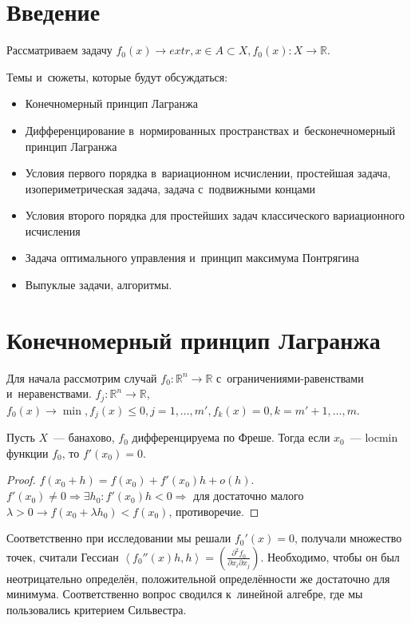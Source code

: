 \documentclass{article}
\begin{document}
\section{Введение}

Рассматриваем задачу $f_0(x) \rightarrow extr, x \in A \subset X, f_0(x): X
\rightarrow \mathbb{R}$.

Темы и~сюжеты, которые будут обсуждаться:
\begin{itemize}
	\item Конечномерный принцип Лагранжа
	\item Дифференцирование в~нормированных пространствах и~бесконечномерный
		принцип Лагранжа
	\item Условия первого порядка в~вариационном исчислении, простейшая задача,
		изопериметрическая задача, задача с~подвижными концами
	\item Условия второго порядка для простейших задач классического вариационного
		исчисления
	\item Задача оптимального управления и~принцип максимума Понтрягина
	\item Выпуклые задачи, алгоритмы.
\end{itemize}

\section{Конечномерный принцип Лагранжа}

Для начала рассмотрим случай $f_0: \mathbb{R}^n \rightarrow \mathbb{R}$
с~ограничениями-равенствами и~неравенствами. $f_j: \mathbb{R}^n \rightarrow
\mathbb{R}$, $f_0(x) \rightarrow \min, f_j(x) \le 0, j = 1, \ldots, m', f_k(x) =
0, k = m' + 1, \ldots, m$.

\begin{theorem}[Ферма, 1638]
	Пусть $X$~--- банахово, $f_0$ дифференцируема по Фреше. Тогда если $x_0$~---
	locmin функции $f_0$, то $f'(x_0) = 0$.
\end{theorem}
\begin{proof}
	$f(x_0 + h) = f(x_0) + f'(x_0)h + o(h)$. $f'(x_0) \ne 0 \Rightarrow \exists
	h_0: f'(x_0)h < 0 \Rightarrow $ для достаточно малого $\lambda > 0 \rightarrow
	f(x_0 + \lambda h_0) < f(x_0)$, противоречие.
\end{proof}

Соответственно при исследовании мы решали $f_0'(x) = 0$, получали множество
точек, считали Гессиан $\left<f_0''(x)h, h\right> = \left(\frac{\partial^2
f_0}{\partial x_i \partial x_j}\right)$. Необходимо, чтобы он был неотрицательно
определён, положительной определённости же достаточно для минимума.
Соответственно вопрос сводился к~линейной алгебре, где мы пользовались критерием
Сильвестра.
\end{document}
